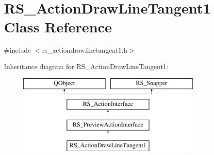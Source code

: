 \hypertarget{classRS__ActionDrawLineTangent1}{\section{R\-S\-\_\-\-Action\-Draw\-Line\-Tangent1 Class Reference}
\label{classRS__ActionDrawLineTangent1}
}


{\ttfamily \#include $<$rs\-\_\-actiondrawlinetangent1.\-h$>$}

Inheritance diagram for R\-S\-\_\-\-Action\-Draw\-Line\-Tangent1\-:\begin{figure}[H]
\begin{center}
\leavevmode
\includegraphics[height=4.000000cm]{classRS__ActionDrawLineTangent1}
\end{center}
\end{figure}
